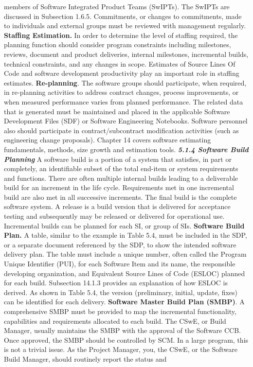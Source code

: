 \documentclass{book}
\begin{document}
\begin{multicols}{2}
		members of Software Integrated Product Teams (SwIPTs).
		The SwIPTs are discussed in Subsection 1.6.5. Commitments,
		or changes to commitments, made to individuals and external groups must be reviewed with management regularly.
		\textbf{Staffing Estimation.} In order to determine the level
		of staffing required, the planning function should consider
		program constraints including milestones, reviews, document and product deliveries, internal milestones, incremental builds, technical constraints, and any changes in
		scope. Estimates of Source Lines Of Code and software
		development productivity play an important role in staffing
		estimates.
		\textbf{Re-planning}. The software groups should participate,
		when required, in re-planning activities to address contract
		changes, process improvements, or when measured performance varies from planned performance. The related data
		that is generated must be maintained and placed in the
		applicable Software Development Files (SDF) or Software
		Engineering Notebooks. Software personnel also should participate in contract/subcontract modification activities (such
		as engineering change proposals). Chapter 14 covers software
		estimating fundamentals, methods, size growth and estimation tools.
		\textbf{\textit{5.1.4 Software Build Planning}}
		A software build is a portion of a system that satisfies, in part
		or completely, an identifiable subset of the total end-item or
		system requirements and functions. There are often multiple
		internal builds leading to a deliverable build for an increment
		in the life cycle. Requirements met in one incremental build
		are also met in all successive increments. The final build is the
		complete software system. A release is a build version that
		is delivered for acceptance testing and subsequently may be
		released or delivered for operational use. Incremental builds
		can be planned for each SI, or group of SIs.
		\textbf{Software Build Plan.} A table, similar to the example in
		Table 5.4, must be included in the SDP, or a separate document referenced by the SDP, to show the intended software
		delivery plan. The table must include a unique number, often
		called the Program Unique Identifier (PUI), for each Software
		Item and its name, the responsible developing organization,
		and Equivalent Source Lines of Code (ESLOC) planned for
		each build. Subsection 14.1.3 provides an explanation of
		how ESLOC is derived. As shown in Table 5.4, the version
		(preliminary, initial, update, fixes) can be identified for each
		delivery.
		\textbf{Software Master Build Plan (SMBP)}. A comprehensive
		SMBP must be provided to map the incremental functionality, capabilities and requirements allocated to each build.
		The CSwE, or Build Manager, usually maintains the SMBP
		with the approval of the Software CCB. Once approved, the
		SMBP should be controlled by SCM. In a large program,
		this is not a trivial issue.
		As the Project Manager, you, the CSwE, or the Software
		Build Manager, should routinely report the status and 

		
	\end{multicols}
 
\end{document}
